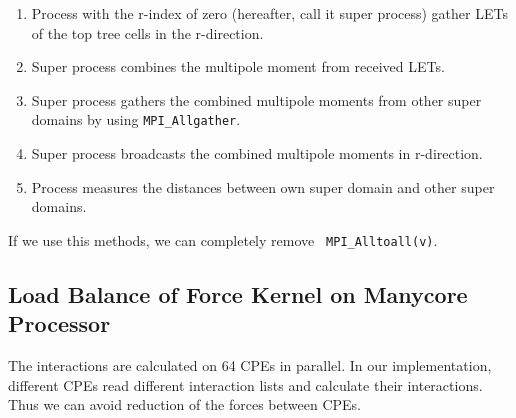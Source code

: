 \documentclass[oribibl]{llncs}
\begin{document}
\begin{enumerate}

\item Process with the r-index of zero (hereafter, call it super
  process) gather LETs of the top tree cells in the r-direction.

\item Super process combines the multipole moment from received LETs.

\item Super process gathers the combined multipole moments from other super
  domains by using {\tt MPI\_Allgather}.

\item Super process broadcasts the combined multipole moments in r-direction.

\item Process measures the distances between own super domain and
  other super domains.

    
  
\end{enumerate}

If we use this methods, we can completely remove {\tt
  MPI\_Alltoall(v)}.



\subsection{Load Balance of Force Kernel on Manycore Processor}
\label{subsec:force}

The interactions are calculated on 64 CPEs in parallel. In our
implementation, different CPEs read different interaction lists and
calculate their interactions. Thus we can avoid reduction of the
forces between CPEs.
\end{document}
